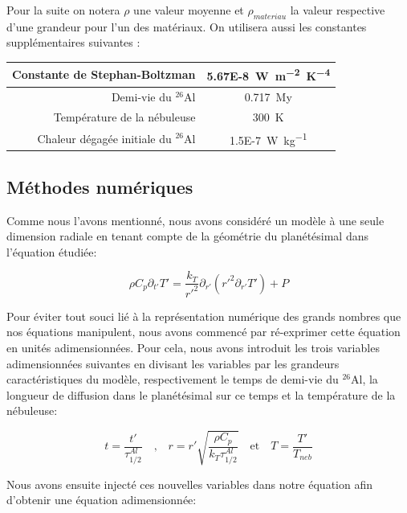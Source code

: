 \documentclass[10pt,a4paper]{article}
\numberwithin{equation}{section}
\begin{document}
Pour la suite on notera $\rho$ une valeur moyenne et $\rho_{materiau}$ la valeur respective d'une grandeur pour l'un des matériaux.
On utilisera aussi les constantes supplémentaires suivantes :

\begin{center}
  \begin{tabu}{ r  c }
    \hline
    Constante de Stephan-Boltzman & \SI{5.67E-8}{W.m^{-2}.K^{-4}}  \\ \hline
    Demi-vie du $^{26}$Al & \SI{0.717}{My}  \\ \hline
    Température de la nébuleuse & \SI{300}{K}  \\ \hline
    Chaleur dégagée initiale du $^{26}$Al & \SI{1.5E-7}{W.kg^{-1}}  \\ \hline
  \end{tabu}
\end{center}


\subsection{Méthodes numériques}

Comme nous l'avons mentionné, nous avons considéré un modèle à une seule dimension radiale en tenant compte de la géométrie du planétésimal dans l'équation étudiée:

\begin{equation}
\rho C_p \partial_{t'} T' = \frac{k_{T} }{r'^2} \partial_{r'} ( {r'}^2 \partial_{r'} T')  + P
\end{equation}



Pour éviter tout souci lié à la représentation numérique des grands nombres que nos équations manipulent, nous avons commencé par ré-exprimer cette équation en unités adimensionnées. Pour cela, nous avons introduit les trois variables adimensionnées suivantes en divisant les variables par les grandeurs caractéristiques du modèle, respectivement le temps de demi-vie du $^{26}$Al, la longueur de diffusion dans le planétésimal sur ce temps et la température de la nébuleuse: 


\begin{equation}
t= \frac{t'}{\tau^{Al}_{1/2}}  \quad \textrm{,} \quad   r = r' \sqrt{\frac{\rho C_p} {k_T \tau^{Al}_{1/2}}} \quad  \textrm{et} \quad T = \frac{T'}{T_{neb}} 
\end{equation}

Nous avons ensuite injecté ces nouvelles variables dans notre équation afin d'obtenir une équation adimensionnée:
\end{document}
